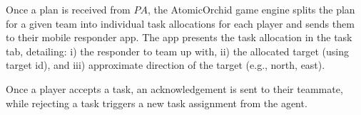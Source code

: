 Once a plan is received from $PA$, the AtomicOrchid game engine splits the plan for a given team into individual task allocations for each player and sends them to their mobile responder app. The app presents the task allocation in the task tab, detailing: i) the responder to team up with, ii) the allocated target (using target id), and iii) approximate direction of the target (e.g., north, east). 

Once a player accepts a task, an acknowledgement is sent to their teammate, while rejecting a task triggers a new task assignment from the agent. 


